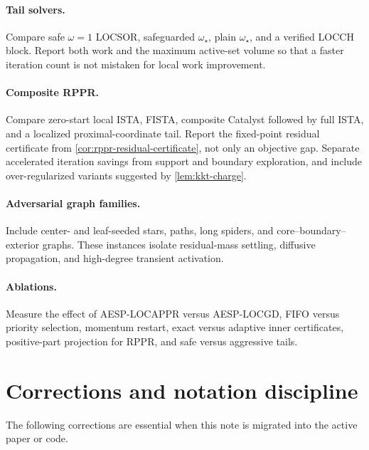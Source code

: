 \paragraph{Tail solvers.}
Compare safe $\omega=1$ LOCSOR, safeguarded $\omega_\star$, plain
$\omega_\star$, and a verified LOCCH block. Report both work and the maximum
active-set volume so that a faster iteration count is not mistaken for local
work improvement.

\paragraph{Composite RPPR.}
Compare zero-start local ISTA, FISTA, composite Catalyst followed by full
ISTA, and a localized proximal-coordinate tail. Report the fixed-point
residual certificate from \cref{cor:rppr-residual-certificate}, not only an
objective gap. Separate accelerated iteration savings from support and
boundary exploration, and include over-regularized variants suggested by
\cref{lem:kkt-charge}.

\paragraph{Adversarial graph families.}
Include center- and leaf-seeded stars, paths, long spiders, and
core--boundary--exterior graphs. These instances isolate residual-mass
settling, diffusive propagation, and high-degree transient activation.

\paragraph{Ablations.}
Measure the effect of AESP-LOCAPPR versus AESP-LOCGD, FIFO versus priority
selection, momentum restart, exact versus adaptive inner certificates,
positive-part projection for RPPR, and safe versus aggressive tails.

\section{Corrections and notation discipline}
\label{sec:corrections}

The following corrections are essential when this note is migrated into the
active paper or code.

